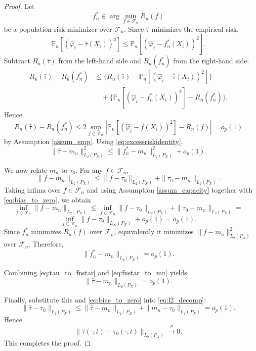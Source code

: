 \documentclass{article}
\newenvironment{proofof}[1]
{\renewcommand{\proofname}{Proof of #1}\begin{proof}}
{\end{proof}}
\begin{document}
\begin{proofof} {Theorem~\ref{thm:consistency_tailored}:}
 
Let
\[
f_n^*\in\arg\min_{f\in\mathcal F_n} R_n(f)
\]
be a population risk minimizer over \(\mathcal F_n\). Since \(\hat\tau\) minimizes the empirical risk,
\[
\mathbb P_n[(\hat\varphi_i-\hat\tau(X_i))^2]
\le
\mathbb P_n[(\hat\varphi_i-f_n^*(X_i))^2].
\]
Subtract \(R_n(\hat\tau)\) from the left-hand side and \(R_n(f_n^*)\) from the right-hand side:
\begin{align*}
R_n(\hat\tau)-R_n(f_n^*)
&\le
\Big\{R_n(\hat\tau)-\mathbb P_n[(\hat\varphi_i-\hat\tau(X_i))^2]\Big\}\\
&\quad+
\Big\{\mathbb P_n[(\hat\varphi_i-f_n^*(X_i))^2]-R_n(f_n^*)\Big\}.
\end{align*}
Hence
\[
R_n(\hat\tau)-R_n(f_n^*)
\le
2\sup_{f\in\mathcal F_n}
\left|
\mathbb P_n[(\hat\varphi_i-f(X_i))^2]-R_n(f)
\right|
=
o_p(1)
\]
by Assumption \ref{assum_emp}. Using \eqref{eq:excessriskidentity},
\begin{equation}\label{eq:tau_to_fnstar}
\|\hat\tau-m_n\|_{L_2(P_X)}^2
\le
\|f_n^*-m_n\|_{L_2(P_X)}^2 + o_p(1).
\end{equation}

 
We now relate \(m_n\) to \(\tau_0\). For any \(f\in\mathcal F_n\),
\[
\|f-m_n\|_{L_2(P_X)}
\le
\|f-\tau_0\|_{L_2(P_X)}+\|\tau_0-m_n\|_{L_2(P_X)}.
\]
Taking infima over \(f\in\mathcal F_n\) and using Assumption \ref{assum_capacity} together with \eqref{eq:bias_to_zero}, we obtain
\[
\inf_{f\in\mathcal F_n}\|f-m_n\|_{L_2(P_X)}
\le
\inf_{f\in\mathcal F_n}\|f-\tau_0\|_{L_2(P_X)}
+
\|\tau_0-m_n\|_{L_2(P_X)}
= \]
\[
\inf_{f\in\mathcal F_n}\|f-\tau_0\|_{L_\infty(P_X)}+o_p(1)
=
o_p(1).
\]
Since \(f_n^*\) minimizes \(R_n(f)\) over \(\mathcal F_n\), equivalently it minimizes \(\|f-m_n\|_{L_2(P_X)}^2\) over \(\mathcal F_n\). Therefore,
\begin{equation}\label{eq:fnstar_to_mn}
\|f_n^*-m_n\|_{L_2(P_X)}=o_p(1).
\end{equation}

Combining \eqref{eq:tau_to_fnstar} and \eqref{eq:fnstar_to_mn} yields
\[
\|\hat\tau-m_n\|_{L_2(P_X)}=o_p(1).
\]

 

Finally, substitute this and \eqref{eq:bias_to_zero} into \eqref{eq:l2_decomp}:
\[
\|\hat\tau-\tau_0\|_{L_2(P_X)}
\le
\|\hat\tau-m_n\|_{L_2(P_X)}
+
\|m_n-\tau_0\|_{L_2(P_X)}
=
o_p(1).
\]
Hence
\[
\|\hat\tau(\cdot;t)-\tau_0(\cdot;t)\|_{L_2(P_X)}\xrightarrow{p}0.
\]
This completes the proof.
\end{proofof}
\end{document}
